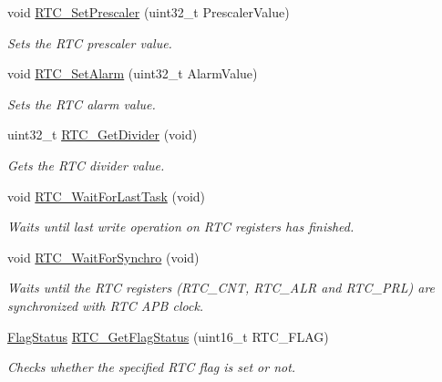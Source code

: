 \begin{DoxyCompactItemize}
void \mbox{\hyperlink{group___r_t_c___exported___functions_gaf76be6071d1ba65b009e0791069e602c}{R\+T\+C\+\_\+\+Set\+Prescaler}} (uint32\+\_\+t Prescaler\+Value)
\begin{DoxyCompactList}\small\item\em Sets the R\+TC prescaler value. \end{DoxyCompactList}\item 
void \mbox{\hyperlink{group___r_t_c___exported___functions_gaec644c636a30ab5e287ba60ffc77132c}{R\+T\+C\+\_\+\+Set\+Alarm}} (uint32\+\_\+t Alarm\+Value)
\begin{DoxyCompactList}\small\item\em Sets the R\+TC alarm value. \end{DoxyCompactList}\item 
uint32\+\_\+t \mbox{\hyperlink{group___r_t_c___exported___functions_gaa4f00e0469fedcf6cbf23760e6d801ed}{R\+T\+C\+\_\+\+Get\+Divider}} (void)
\begin{DoxyCompactList}\small\item\em Gets the R\+TC divider value. \end{DoxyCompactList}\item 
void \mbox{\hyperlink{group___r_t_c___exported___functions_gaa0a406ef860d5231748c5f0d82673036}{R\+T\+C\+\_\+\+Wait\+For\+Last\+Task}} (void)
\begin{DoxyCompactList}\small\item\em Waits until last write operation on R\+TC registers has finished. \end{DoxyCompactList}\item 
void \mbox{\hyperlink{group___r_t_c___exported___functions_gaca4346e0dc15dccc15179786b28450db}{R\+T\+C\+\_\+\+Wait\+For\+Synchro}} (void)
\begin{DoxyCompactList}\small\item\em Waits until the R\+TC registers (R\+T\+C\+\_\+\+C\+NT, R\+T\+C\+\_\+\+A\+LR and R\+T\+C\+\_\+\+P\+RL) are synchronized with R\+TC A\+PB clock. \end{DoxyCompactList}\item 
\mbox{\hyperlink{group___exported__types_ga89136caac2e14c55151f527ac02daaff}{Flag\+Status}} \mbox{\hyperlink{group___r_t_c___exported___functions_ga21a85e5f846cb4552d5e76420779f3f6}{R\+T\+C\+\_\+\+Get\+Flag\+Status}} (uint16\+\_\+t R\+T\+C\+\_\+\+F\+L\+AG)
\begin{DoxyCompactList}\small\item\em Checks whether the specified R\+TC flag is set or not. \end{DoxyCompactList}\item 

\end{DoxyCompactItemize}
